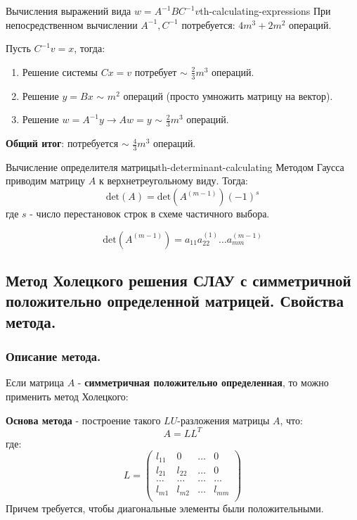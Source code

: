 \documentclass[14pt]{extarticle}
\begin{document}
    \begin{theorem}{Вычисления выражений вида $w = A^{-1}BC^{-1}v$}{th-calculating-expressions}
        При непосредственном вычислении $A^{-1}, C^{-1}$ потребуется: $4m^{3} + 2m^{2}$ операций.

        \vspace{\baselineskip}

        Пусть $C^{-1}v = x$, тогда: 
        \begin{enumerate}
            \item Решение системы $Cx = v$ потребует $\sim$ $\frac{2}{3}m^{3}$ операций.
            \item Решение $y = Bx$ $\sim$ $m^{2}$ операций (просто умножить матрицу на вектор).
            \item Решение $w = A^{-1}y \rightarrow Aw = y$ $\sim$ $\frac{2}{3} m^{3}$ операций.
        \end{enumerate}
        \textbf{Общий итог}: потребуется $\sim$ $\frac{4}{3}m^{3}$ операций.
    \end{theorem}

    \begin{theorem}{Вычисление определителя матрицы}{th-determinant-calculating}
        Методом Гаусса приводим матрицу $A$ к верхнетреугольному виду. Тогда:
        $$\text{det}(A) = \text{det}(A^{(m - 1)})(-1)^s$$
        где $s$ - число перестановок строк в схеме частичного выбора.

        $$\text{det}(A^{(m-1)}) = a_{11}a_{22}^{(1)} \ldots a_{mm}^{(m - 1)}$$
    \end{theorem}

\clearpage
\subsection{Метод Холецкого решения СЛАУ с симметричной положительно определенной матрицей. Свойства метода.}

    \subsubsection{Описание метода.}

        Если матрица $A$ - \textbf{симметричная положительно определенная}, то можно применить метод Холецкого:

        \vspace{\baselineskip}

        \textbf{Основа метода} - построение такого $LU$-разложения матрицы $A$, что:
        $$A = LL^{T}$$
        где:
        $$
        L = \begin{pmatrix}
            l_{11} & 0 & \ldots & 0\\
            l_{21} & l_{22} & \ldots & 0\\
            \ldots & \ldots & \ldots & \ldots\\
            l_{m1} & l_{m2} & \ldots & l_{mm}\\
        \end{pmatrix}
        $$
        Причем требуется, чтобы диагональные элементы были положительными.
\end{document}
